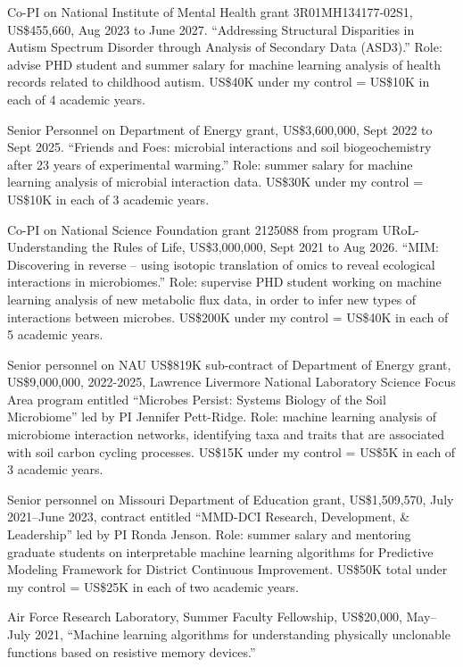 \documentclass[margin,line]{res}
\begin{document}
\begin{resume}
Co-PI on National Institute of Mental Health grant 3R01MH134177-02S1,
US\$455,660, Aug 2023 to June 2027. ``Addressing Structural Disparities in Autism Spectrum Disorder through Analysis of Secondary Data (ASD3).'' Role: advise PHD student and summer salary for
machine learning analysis of health records related to childhood
autism. US\$40K under my control = US\$10K in each of 4 academic
years.

Senior Personnel on Department of Energy grant, US\$3,600,000, Sept 2022 to
Sept 2025. ``Friends and Foes: microbial interactions and soil
biogeochemistry after 23 years of experimental warming.'' Role: summer
salary for machine learning analysis of microbial interaction data.
US\$30K under my control = US\$10K in each of 3 academic years.

Co-PI on National Science Foundation grant 2125088 from program URoL-Understanding the Rules of Life, US\$3,000,000, Sept 2021
to Aug 2026. ``MIM: Discovering in reverse – using isotopic
translation of omics to reveal ecological interactions in
microbiomes.'' Role: supervise PHD student working on machine learning
analysis of new metabolic flux data, in order to infer new types of
interactions between microbes. US\$200K under my control = US\$40K in
each of 5 academic years.

Senior personnel on NAU US\$819K sub-contract of Department of Energy
grant, US\$9,000,000, 2022-2025, Lawrence Livermore National
Laboratory Science Focus Area program entitled ``Microbes Persist:
Systems Biology of the Soil Microbiome'' led by PI Jennifer
Pett-Ridge. Role: machine learning analysis of microbiome interaction
networks, identifying taxa and traits that are associated with soil
carbon cycling processes. US\$15K under my control = US\$5K in each of
3 academic years.

Senior personnel on Missouri Department of Education grant,
US\$1,509,570, July 2021--June 2023, contract entitled ``MMD-DCI
Research, Development, \& Leadership'' led by PI Ronda Jenson. Role:
summer salary and mentoring graduate students on interpretable machine
learning algorithms for Predictive Modeling Framework for District
Continuous Improvement. US\$50K total under my control = US\$25K in
each of two academic years.

Air Force Research Laboratory, Summer Faculty Fellowship, US\$20,000,
May--July 2021, ``Machine learning algorithms for understanding
physically unclonable functions based on resistive memory devices.''


\end{resume}
\end{document}

